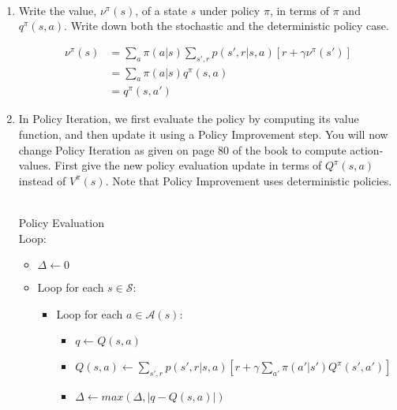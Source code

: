 \documentclass{exam}
\begin{document}
\begin{problem}
\ \newline
\begin{enumerate}
    \item Write the value, $\nu^{\pi}(s)$, of a state $s$ under policy $\pi$, in terms of $\pi$ and $q^{\pi}(s,a)$. Write down both the stochastic and the deterministic policy case.
    \begin{solutionorlines}[2in]
    \begin{align*}
        \nu^{\pi}(s) &=\sum_a \pi(a|s) \sum_{s', r} p(s', r|s, a) [r + \gamma \nu^{\pi}(s')]\\
        &= \sum_a \pi(a|s) q^{\pi}(s,a) \tag{stochastic case}\\
        &= q^{\pi}(s, a') \tag{deterministic case with action $a'$}
    \end{align*}
    \end{solutionorlines}
    \item In Policy Iteration, we first evaluate the policy by computing its value function, and then update it using a Policy Improvement step. You will now change Policy Iteration as given on page 80 of the book to compute action-values. First give the new policy evaluation update in terms of $Q^{\pi}(s, a)$ instead of $V^{\pi}(s)$. Note that Policy Improvement uses deterministic policies.
    \begin{solutionorlines}[2in]
    \ \\
    Policy Evaluation\\
    Loop:
    \begin{itemize}[noitemsep,nolistsep]
        \item[ ] $\Delta \leftarrow 0$
        \item[ ] Loop for each $s \in \mathcal{S}$:
        \begin{itemize}[noitemsep,nolistsep]
            \item[ ] Loop for each $a \in \mathcal{A}(s)$:
            \begin{itemize}[noitemsep,nolistsep]
                \item[ ] $q \leftarrow Q(s, a)$
                \item[ ] $Q(s, a) \leftarrow \sum_{s', r} p(s', r| s, a) [r + \gamma \sum_{a'} \pi(a'|s') Q^{\pi}(s', a')]$
                \item[ ] $\Delta \leftarrow max(\Delta, |q - Q(s, a)|)$
            \end{itemize}
        \end{itemize}

\end{itemize}
\end{solutionorlines}
\end{enumerate}
\end{problem}
\end{document}
